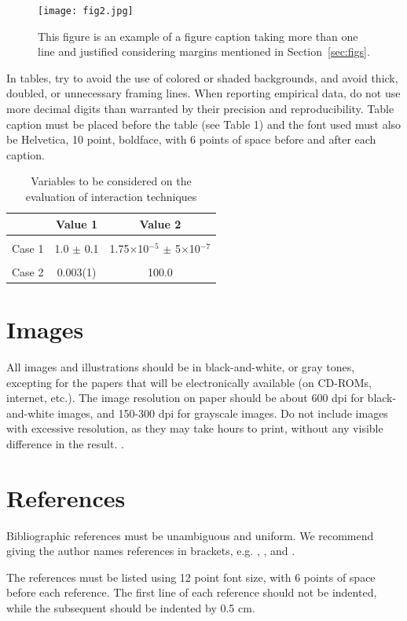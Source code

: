 \documentclass[12pt]{article}
\begin{document}
\begin{figure}[ht]
\centering
\texttt{[image: fig2.jpg]}
\caption{This figure is an example of a figure caption taking more than one
  line and justified considering margins mentioned in Section~\ref{sec:figs}.}
\label{fig:exampleFig2}
\end{figure}

In tables, try to avoid the use of colored or shaded backgrounds, and avoid
thick, doubled, or unnecessary framing lines. When reporting empirical data,
do not use more decimal digits than warranted by their precision and
reproducibility. Table caption must be placed before the table (see Table 1)
and the font used must also be Helvetica, 10 point, boldface, with 6 points of
space before and after each caption.

\begin{table}[ht]
\centering
\caption{Variables to be considered on the evaluation of interaction
  techniques}
\label{tab:exTable1}
\smallskip
\begin{tabular}{|l|c|c|}
\hline
& Value 1 & Value 2\\[0.5ex]
\hline
&&\\[-2ex]
Case 1 & 1.0 $\pm$ 0.1 & 1.75$\times$10$^{-5}$ $\pm$ 5$\times$10$^{-7}$\\[0.5ex]
\hline
&&\\[-2ex]
Case 2 & 0.003(1) & 100.0\\[0.5ex]
\hline
\end{tabular}
\end{table}

\section{Images}

All images and illustrations should be in black-and-white, or gray tones,
excepting for the papers that will be electronically available (on CD-ROMs,
internet, etc.). The image resolution on paper should be about 600 dpi for
black-and-white images, and 150-300 dpi for grayscale images.  Do not include
images with excessive resolution, as they may take hours to print, without any
visible difference in the result. \cite{starner1997augmented}.

\section{References}

Bibliographic references must be unambiguous and uniform.  We recommend giving
the author names references in brackets, e.g. \cite{knuth:84},
\cite{boulic:91}, and \cite{smith:99}.

The references must be listed using 12 point font size, with 6 points of space
before each reference. The first line of each reference should not be
indented, while the subsequent should be indented by 0.5 cm.



\end{document}
